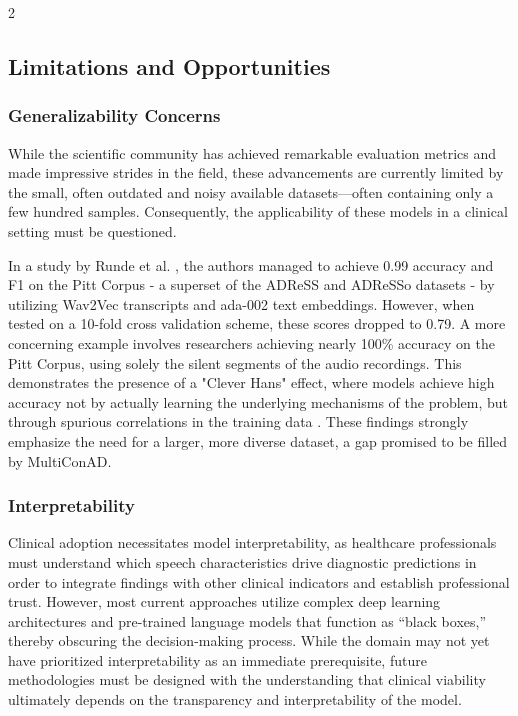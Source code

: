 \documentclass[10pt]{article}
\begin{document}
\begin{multicols}{2}
\subsection{Limitations and Opportunities} \subsubsection{Generalizability
Concerns} \par While the scientific community has achieved remarkable
evaluation metrics and made impressive strides in the field, these advancements
are currently limited by the small, often outdated and noisy available
datasets—often containing only a few hundred samples. Consequently, the
applicability of these models in a clinical setting must be questioned. \par In
a study by Runde et al. \cite{rundeOptimizationNaturalLanguage2024}, the
authors managed to achieve 0.99 accuracy and F1 on the Pitt Corpus - a superset
of the ADReSS and ADReSSo datasets - by utilizing Wav2Vec transcripts and
ada-002 text embeddings. However, when tested on a 10-fold cross validation
scheme, these scores dropped to 0.79. A more concerning example involves
researchers achieving nearly 100\% accuracy on the Pitt Corpus, using solely
the silent segments of the audio recordings. This demonstrates the presence of
a "Clever Hans" effect, where models achieve high accuracy not by actually
learning the underlying mechanisms of the problem, but through spurious
correlations in the training data \cite{liuCleverHansEffect2024}. These
findings strongly emphasize the need for a larger, more diverse dataset, a gap
promised to be filled by MultiConAD.

\subsubsection{Interpretability} \par Clinical adoption necessitates model
interpretability, as healthcare professionals must understand which speech
characteristics drive diagnostic predictions in order to integrate findings
with other clinical indicators and establish professional trust. However, most
current approaches utilize complex deep learning architectures and pre-trained
language models that function as ``black boxes,'' thereby obscuring the
decision-making process. While the domain may not yet have prioritized
interpretability as an immediate prerequisite, future methodologies must be
designed with the understanding that clinical viability ultimately depends on
the transparency and interpretability of the model.


\end{multicols}
\end{document}
